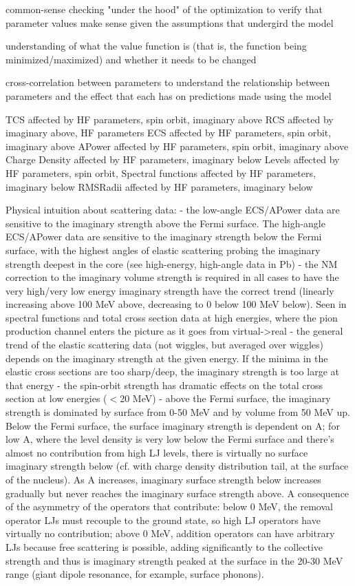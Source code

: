 common-sense checking "under the hood" of the optimization to verify that
parameter values make sense given the assumptions that undergird the model

understanding of what the value function is (that is, the function being
minimized/maximized) and whether it needs to be changed

cross-correlation between parameters to understand the relationship between
parameters and the effect that each has on predictions made using the model

TCS affected by HF parameters, spin orbit, imaginary above
RCS affected by imaginary above, HF parameters
ECS affected by HF parameters, spin orbit, imaginary above
APower affected by HF parameters, spin orbit,  imaginary above
Charge Density affected by HF parameters, imaginary below
Levels affected by HF parameters, spin orbit,
Spectral functions affected by HF parameters, imaginary below
RMSRadii affected by HF parameters, imaginary below

Physical intuition about scattering data:
- the low-angle ECS/APower data are sensitive to the imaginary strength above
the Fermi surface. The high-angle ECS/APower data are sensitive to the imaginary
strength below the Fermi surface, with the highest angles of elastic scattering
probing the imaginary strength deepest in the core (see high-energy, high-angle
data in Pb)
- the NM correction to the imaginary volume strength is required in all cases to
have the very high/very low energy imaginary strength have the correct trend
(linearly increasing above 100 MeV above, decreasing to 0 below 100 MeV below).
Seen in spectral functions and total cross section data at high energies, where
the pion production channel enters the picture as it goes from virtual->real
- the general trend of the elastic scattering data (not wiggles, but averaged
over wiggles) depends on the imaginary strength at the given energy. If the
minima in the elastic cross sections are too sharp/deep, the imaginary strength
is too large at that energy
- the spin-orbit strength has dramatic effects on the total cross section at low
energies ($<$20 MeV)
- above the Fermi surface, the imaginary strength is dominated by surface from
0-50 MeV and by volume from 50 MeV up. Below the Fermi surface, the surface
imaginary strength is dependent on A; for low A, where the level density is very
low below the Fermi surface and there's almost no contribution from high LJ
levels, there is virtually no surface imaginary strength below (cf. with charge
density distribution tail, at the surface of the nucleus). As A increases, 
imaginary surface strength below increases gradually but never reaches the
imaginary surface strength above. A consequence of the asymmetry of the
operators that contribute: below 0 MeV, the removal operator LJs
must recouple to the ground state, so high LJ operators have virtually no
contribution; above 0 MeV, addition operators can have arbitrary LJs because
free scattering is possible, adding significantly to the collective strength and
thus is imaginary strength peaked at the surface in the 20-30 MeV range (giant
dipole resonance, for example, surface phonons).


